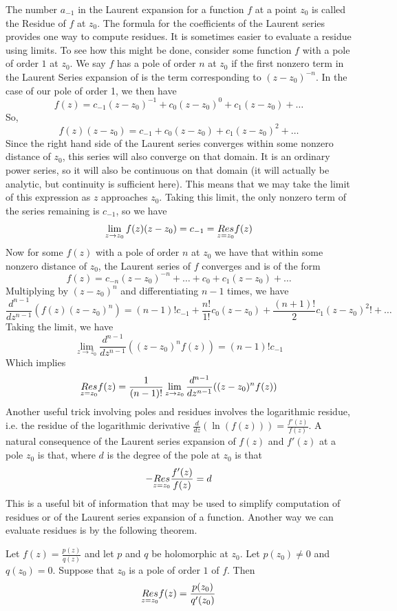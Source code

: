 The number $a_{-1}$ in the Laurent expansion for a function $f$ at a point $z_0$ is called the Residue of $f$ at $z_0$.
The formula for the coefficients of the Laurent series provides one way to compute residues.
It is sometimes easier to evaluate a residue using limits.
To see how this might be done, consider some function $f$ with a pole of order $1$ at $z_0$.
We say $f$ has a pole of order $n$ at $z_0$ if the first nonzero term in the Laurent Series expansion of is the term corresponding to $(z-z_0)^{-n}$.
In the case of our pole of order 1, we then have
\[f(z)=c_{-1}(z-z_0)^{-1}+c_0 (z-z_0)^{0} +c_1 (z-z_0) + \dots\]
So,
\[f(z)(z-z_0)=c_{-1}+c_0 (z-z_0) + c_1 (z-z_0)^2 + \dots\]
Since the right hand side of the Laurent series converges within some nonzero distance of $z_0$, this series will also converge on that domain.
It is an ordinary power series, so it will also be continuous on that domain (it will actually be analytic, but continuity is sufficient here).
This means that we may take the limit of this expression as $z$ approaches $z_0$.
Taking this limit, the only nonzero term of the series remaining is $c_{-1}$, so we have
\[\lim_{z\to z_0} f(z)(z-z_0) = c_{-1} = \underset{z=z_0}{Res} f(z)\]
Now for some $f(z)$ with a pole of order $n$ at $z_0$ we have that within some nonzero distance of $z_0$, the Laurent series of $f$ converges and is of the form
\[f(z)=c_{-n}(z-z_0)^{-n}+\dots+c_0+c_1(z-z_0)+\dots\]
Multiplying by $(z-z_0)^{n}$ and differentiating $n-1$ times, we have
\[\frac{d^{n-1}}{dz^{n-1}}(f(z)(z-z_0)^{n})=(n-1)! c_{-1} + \frac{n!}{1!} c_0 (z-z_0) + \frac{(n+1)!}{2} c_1 (z-z_0)^2!+\dots\]
Taking the limit, we have
\[\lim_{z\to z_0}\frac{d^{n-1}}{dz^{n-1}}((z-z_0)^n f(z)) = (n-1)! c_{-1}\]
Which implies
\[\underset{z=z_0}{Res}f(z)=\frac{1}{(n-1)!}\lim_{z\to z_0}\frac{d^{n-1}}{dz^{n-1}}((z-z_0)^n f(z))\]
Another useful trick involving poles and residues involves the logarithmic residue, i.e. the residue of the logarithmic derivative $\frac{d}{dz}(\ln(f(z))) = \frac{f'(z)}{f(z)}$.
A natural consequence of the Laurent series expansion of $f(z)$ and $f'(z)$ at a pole $z_0$ is that, where $d$ is the degree of the pole at $z_0$ is that
\[- \underset{z=z_0}{Res} \frac{f'(z)}{f(z)} = d\]
This is a useful bit of information that may be used to simplify computation of residues or of the Laurent series expansion of a function.
Another way we can evaluate residues is by the following theorem.
\begin{theorem}
Let $f(z)=\frac{p(z)}{q(z)}$ and let $p$ and $q$ be holomorphic at $z_0$. Let $p(z_0) \neq 0$ and $q(z_0)=0$.
Suppose that $z_0$ is a pole of order $1$ of $f$.
Then
\[\underset{z=z_0}{Res} f(z) = \frac{p(z_0)}{q'(z_0)}\]
\end{theorem}

